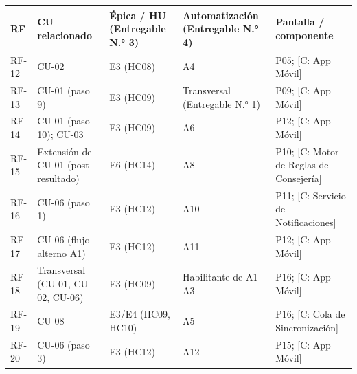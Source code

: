 \documentclass[11pt,a4paper]{article}
\begin{document}
{\small
\begin{longtable}[]{@{}
  >{\raggedright\arraybackslash}p{}
  >{\raggedright\arraybackslash}p{}
  >{\raggedright\arraybackslash}p{}
  >{\raggedright\arraybackslash}p{}
  >{\raggedright\arraybackslash}p{}@{}}
\toprule\noalign{}
\begin{minipage}[b]{\linewidth}\raggedright
RF
\end{minipage} & \begin{minipage}[b]{\linewidth}\raggedright
CU relacionado
\end{minipage} & \begin{minipage}[b]{\linewidth}\raggedright
Épica / HU (Entregable N.° 3)
\end{minipage} & \begin{minipage}[b]{\linewidth}\raggedright
Automatización (Entregable N.° 4)
\end{minipage} & \begin{minipage}[b]{\linewidth}\raggedright
Pantalla / componente
\end{minipage} \\
\midrule\noalign{}
\endhead
\bottomrule\noalign{}
\endlastfoot
RF-12 & CU-02 & E3 (HC08) & A4 & P05; {[}C: App Móvil{]} \\
RF-13 & CU-01 (paso 9) & E3 (HC09) & Transversal (Entregable N.° 1) & P09; {[}C: App Móvil{]} \\
RF-14 & CU-01 (paso 10); CU-03 & E3 (HC09) & A6 & P12; {[}C: App Móvil{]} \\
RF-15 & Extensión de CU-01 (post-resultado) & E6 (HC14) & A8 & P10; {[}C: Motor de Reglas de Consejería{]} \\
RF-16 & CU-06 (paso 1) & E3 (HC12) & A10 & P11; {[}C: Servicio de Notificaciones{]} \\
RF-17 & CU-06 (flujo alterno A1) & E3 (HC12) & A11 & P12; {[}C: App Móvil{]} \\
RF-18 & Transversal (CU-01, CU-02, CU-06) & E3 (HC09) & Habilitante de A1-A3 & P16; {[}C: App Móvil{]} \\
RF-19 & CU-08 & E3/E4 (HC09, HC10) & A5 & P16; {[}C: Cola de Sincronización{]} \\
RF-20 & CU-06 (paso 3) & E3 (HC12) & A12 & P15; {[}C: App Móvil{]} \\
\end{longtable}
}
\end{document}
